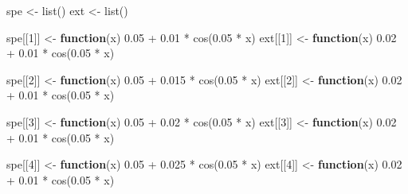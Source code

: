 \documentclass[
]{article}
\newenvironment{Shaded}{\begin{snugshade}}{\end{snugshade}}
\newcommand{\ControlFlowTok}[1]{\textcolor[rgb]{0.13,0.29,0.53}{\textbf{#1}}}
\newcommand{\DecValTok}[1]{\textcolor[rgb]{0.00,0.00,0.81}{#1}}
\newcommand{\FloatTok}[1]{\textcolor[rgb]{0.00,0.00,0.81}{#1}}
\newcommand{\FunctionTok}[1]{\textcolor[rgb]{0.00,0.00,0.00}{#1}}
\newcommand{\NormalTok}[1]{#1}
\newcommand{\OtherTok}[1]{\textcolor[rgb]{0.56,0.35,0.01}{#1}}
\newcommand{\SpecialCharTok}[1]{\textcolor[rgb]{0.00,0.00,0.00}{#1}}
\begin{document}
\begin{Shaded}
\begin{Highlighting}[]
\NormalTok{spe }\OtherTok{\textless{}{-}} \FunctionTok{list}\NormalTok{()}
\NormalTok{ext }\OtherTok{\textless{}{-}} \FunctionTok{list}\NormalTok{()}

\NormalTok{spe[[}\DecValTok{1}\NormalTok{]] }\OtherTok{\textless{}{-}} \ControlFlowTok{function}\NormalTok{(x) }\FloatTok{0.05} \SpecialCharTok{+} \FloatTok{0.01} \SpecialCharTok{*} \FunctionTok{cos}\NormalTok{(}\FloatTok{0.05} \SpecialCharTok{*}\NormalTok{ x)}
\NormalTok{ext[[}\DecValTok{1}\NormalTok{]] }\OtherTok{\textless{}{-}} \ControlFlowTok{function}\NormalTok{(x) }\FloatTok{0.02} \SpecialCharTok{+} \FloatTok{0.01} \SpecialCharTok{*} \FunctionTok{cos}\NormalTok{(}\FloatTok{0.05} \SpecialCharTok{*}\NormalTok{ x)}

\NormalTok{spe[[}\DecValTok{2}\NormalTok{]] }\OtherTok{\textless{}{-}} \ControlFlowTok{function}\NormalTok{(x) }\FloatTok{0.05} \SpecialCharTok{+} \FloatTok{0.015} \SpecialCharTok{*} \FunctionTok{cos}\NormalTok{(}\FloatTok{0.05} \SpecialCharTok{*}\NormalTok{ x)}
\NormalTok{ext[[}\DecValTok{2}\NormalTok{]] }\OtherTok{\textless{}{-}} \ControlFlowTok{function}\NormalTok{(x) }\FloatTok{0.02} \SpecialCharTok{+} \FloatTok{0.01} \SpecialCharTok{*} \FunctionTok{cos}\NormalTok{(}\FloatTok{0.05} \SpecialCharTok{*}\NormalTok{ x)}

\NormalTok{spe[[}\DecValTok{3}\NormalTok{]] }\OtherTok{\textless{}{-}} \ControlFlowTok{function}\NormalTok{(x) }\FloatTok{0.05} \SpecialCharTok{+} \FloatTok{0.02} \SpecialCharTok{*} \FunctionTok{cos}\NormalTok{(}\FloatTok{0.05} \SpecialCharTok{*}\NormalTok{ x)}
\NormalTok{ext[[}\DecValTok{3}\NormalTok{]] }\OtherTok{\textless{}{-}} \ControlFlowTok{function}\NormalTok{(x) }\FloatTok{0.02} \SpecialCharTok{+} \FloatTok{0.01} \SpecialCharTok{*} \FunctionTok{cos}\NormalTok{(}\FloatTok{0.05} \SpecialCharTok{*}\NormalTok{ x)}

\NormalTok{spe[[}\DecValTok{4}\NormalTok{]] }\OtherTok{\textless{}{-}} \ControlFlowTok{function}\NormalTok{(x) }\FloatTok{0.05} \SpecialCharTok{+} \FloatTok{0.025} \SpecialCharTok{*} \FunctionTok{cos}\NormalTok{(}\FloatTok{0.05} \SpecialCharTok{*}\NormalTok{ x)}
\NormalTok{ext[[}\DecValTok{4}\NormalTok{]] }\OtherTok{\textless{}{-}} \ControlFlowTok{function}\NormalTok{(x) }\FloatTok{0.02} \SpecialCharTok{+} \FloatTok{0.01} \SpecialCharTok{*} \FunctionTok{cos}\NormalTok{(}\FloatTok{0.05} \SpecialCharTok{*}\NormalTok{ x)}
\end{Highlighting}
\end{Shaded}
\end{document}
